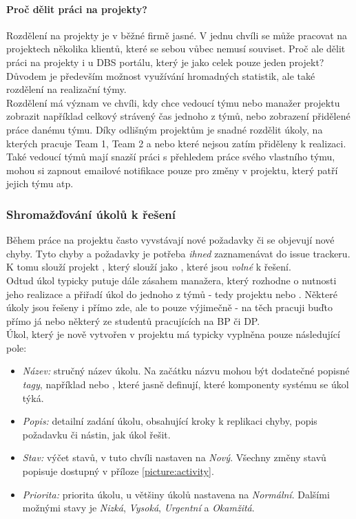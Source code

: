 \paragraph{Proč dělit práci na projekty?}
Rozdělení na projekty je v běžné firmě jasné. V jednu chvíli se může pracovat na projektech několika klientů, které se sebou vůbec nemusí souviset. Proč ale dělit práci na projekty i u DBS portálu, který je jako celek pouze jeden projekt? Důvodem je především možnost využívání hromadných statistik, ale také rozdělení na realizační týmy.\\
Rozdělení má význam ve chvíli, kdy chce vedoucí týmu nebo manažer projektu zobrazit například celkový strávený čas jednoho z týmů, nebo zobrazení přidělené práce danému týmu. Díky odlišným projektům je snadné rozdělit úkoly, na kterých pracuje Team 1, Team 2 a nebo které nejsou zatím přiděleny k realizaci. Také vedoucí týmů mají snazší práci s přehledem práce svého vlastního týmu, mohou si zapnout emailové notifikace pouze pro změny v projektu, který patří jejich týmu atp.

\subsubsection{Shromažďování úkolů k řešení}

Během práce na projektu často vyvstávají nové požadavky či se objevují nové chyby. Tyto chyby a požadavky je potřeba \emph{ihned} zaznamenávat do issue trackeru. K tomu slouží projekt , který slouží jako , které jsou \emph{volné} k řešení.\\
Odtud úkol typicky putuje dále zásahem manažera, který rozhodne o nutnosti jeho realizace a přiřadí úkol do jednoho z týmů - tedy projektu  nebo . Některé úkoly jsou řešeny i přímo zde, ale to pouze výjimečně - na těch pracuji buďto přímo já nebo některý ze studentů pracujících na BP či DP.\\
Úkol, který je nově vytvořen v  projektu má typicky vyplněna pouze následující pole:
\begin{itemize}
	\item \emph{Název:} stručný název úkolu. Na začátku názvu mohou být dodatečné popisné \emph{tagy}, například \code{[databaze]} nebo \code{[menu]}, které jasně definují, které komponenty systému se úkol týká.
	\item \emph{Popis:} detailní zadání úkolu, obsahující kroky k replikaci chyby, popis požadavku či nástin, jak úkol řešit.
	\item \emph{Stav:} výčet stavů, v tuto chvíli nastaven na \emph{Nový}. Všechny změny stavů popisuje  dostupný v příloze \ref{picture:activity}.
	\item \emph{Priorita:} priorita úkolu, u většiny úkolů nastavena na \emph{Normální}. Dalšími možnými stavy je \emph{Nizká}, \emph{Vysoká}, \emph{Urgentní} a \emph{Okamžitá}.
\end{itemize}


